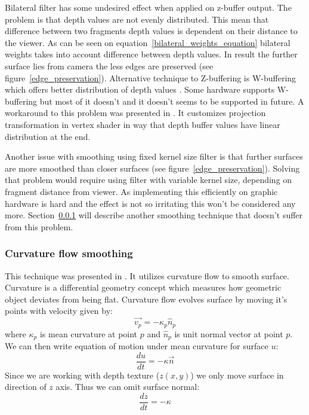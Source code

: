 Bilateral filter has some undesired effect when applied on z-buffer output. The problem is that depth values are not evenly distributed. This mean that difference between two fragments depth values is dependent on their distance to the viewer. As can be seen on equation~\ref{bilateral_weights_equation} bilateral weights takes into account difference between depth values. In result the further surface lies from camera the less edges are preserved (see figure~\ref{edge_preservation}). Alternative technique to Z-buffering is W-buffering which offers better distribution of depth values \cite{Gregory2009}. Some hardware supports W-buffering but most of it doesn't and it doesn't seems to be supported in future. A workaround to this problem was presented in \cite{Dunlop2006}. It customizes projection transformation in vertex shader in way that depth buffer values have linear distribution at the end. 

Another issue with smoothing using fixed kernel size filter is that further surfaces are more smoothed than closer surfaces (see figure~\ref{edge_preservation}). Solving that problem would require using filter with variable kernel size, depending on fragment distance from viewer. As implementing this efficiently on graphic hardware is hard and the effect is not so irritating this won't be considered any more. Section~\ref{sec:curvatureflowsmoothing} will describe another smoothing technique that doesn't suffer from this problem. 

\subsubsection{Curvature flow smoothing} \label{sec:curvatureflowsmoothing}
This technique was presented in \cite{laanSainz2009}. It utilizes curvature flow to smooth surface. Curvature is a differential geometry concept which measures how geometric object deviates from being flat. Curvature flow evolves surface by moving it's points with velocity given by:
\begin{equation}
\vec{v_p} = -\kappa_p \hat{n}_p
\end{equation}
where $\kappa_p$ is mean curvature at point $p$ and $\hat{n}_p$ is unit normal vector at point $p$.
We can then write equation of motion under mean curvature for surface $u$:
\begin{equation}
\label{eq:curvature_flow}
\frac{du}{dt} = -\kappa \vec{n}
\end{equation}
Since we are working with depth texture ($z(x, y)$) we only move surface in direction of $z$ axis. Thus we can omit surface normal:
\begin{equation}
\label{eq:curvature_flow_z}
\frac{dz}{dt} = -\kappa
\end{equation}

